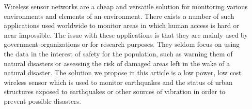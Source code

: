  Wireless sensor networks are a cheap and versatile solution for monitoring various environments 
and elements of an environment. There exists a number of such applications used worldwide to monitor 
areas in which human access is hard or near impossible. The issue with these applications is that 
they are mainly used by government organizations or for research purposes. They seldom focus on 
using the data in the interest of safety for the population, such as warning them of natural 
disasters or assessing the risk of damaged areas left in the wake of a natural disaster. The 
solution we propose in this article is a low power, low cost wireless sensor which is used to 
monitor earthquakes and the status of urban structures exposed to earthquakes or other sources 
of vibration in order to prevent possible disasters.
